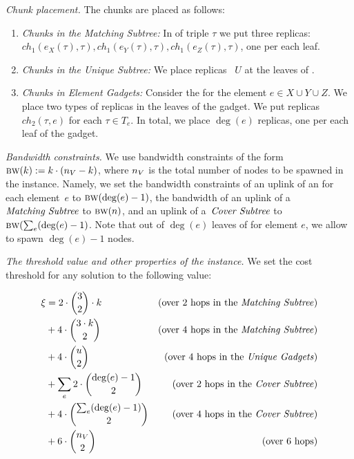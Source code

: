 \emph{Chunk placement.}
The chunks are placed as follows:
\begin{enumerate}
  \item \emph{Chunks in the Matching Subtree:} In {\TripleGadget} of triple $\tau$ we put
  three replicas:
 ~$ch_1(e_X(\tau), \tau), ch_1(e_Y(\tau), \tau), ch_1(e_Z(\tau), \tau)$, one per each leaf.
  \item \emph{Chunks in the Unique Subtree:} We place replicas
 ~$U$ at the leaves of \UnqGadgets.
 \item \emph{Chunks in Element Gadgets:} Consider the \ElGadget{} for the element $e \in X\cup Y\cup Z$.
 We place two types of replicas in the leaves of the gadget.
 We put replicas $ch_2(\tau, e)$ for each $\tau \in T_e$.
 In total, we place $\deg(e)$ replicas, one per each leaf of the gadget.
\end{enumerate}

\emph{Bandwidth constraints.} We use bandwidth constraints of the form
$\textsc{bw}(k) := k\cdot(n_V - k)$, where $n_V$ is the total number of nodes to be spawned in the instance. Namely, we set the bandwidth
constraints of an uplink of an {\ElGadget} for each element~$e$ to 
$\textsc{bw}(\deg(e)-1)$, the bandwidth of an uplink of a~${\emph{Matching Subtree}}$ to 
$\textsc{bw}(n)$, and an uplink of a~${\emph{Cover Subtree}}$ to 
$\textsc{bw}(\sum_e (\deg(e)-1)$.
Note that out of $\deg(e)$ leaves of \ElGadget{} for element $e$, we allow to spawn $\deg(e)-1$ nodes.

\emph{The threshold value and other properties of the instance.} We set the
cost threshold for any solution to the following value:

\begin{align*}
  \xi  & = 2\cdot \binom{3}{2}\cdot k & \mbox{(over 2 hops in the {\emph{Matching Subtree}}{})}\\
        & + 4 \cdot \binom{3\cdot k}{2} & \mbox{(over 4 hops in the {\emph{Matching Subtree}}{})}\\
        & + 4 \cdot \binom{u}{2} & \mbox{(over 4 hops in the {\emph{Unique Gadgets}}{})}\\
        & + \sum_e 2\cdot\binom{\deg(e)-1}{2} & \mbox{(over 2 hops in the {\emph{Cover Subtree}}{})}\\
        & + 4\cdot \binom{\sum_e(\deg(e)-1)}{2} & \mbox{(over 4 hops in the {\emph{Cover Subtree}}{})}\\
        & + 6\cdot\binom{n_V}{2} & \mbox{(over 6 hops)}
\end{align*}

